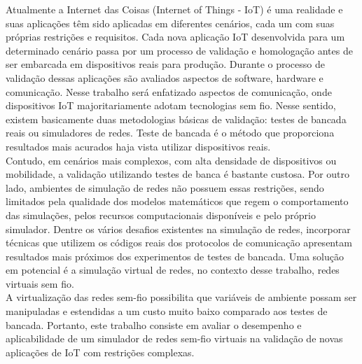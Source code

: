 %
%


Atualmente a Internet das Coisas (Internet of Things - IoT) é uma realidade e suas aplicações têm sido aplicadas em diferentes cenários, cada um com suas próprias restrições e requisitos. Cada nova aplicação IoT desenvolvida para um determinado cenário passa por um processo de validação e homologação antes de ser embarcada em dispositivos reais para produção. Durante o processo de validação dessas aplicações são avaliados aspectos de software, hardware e comunicação. Nesse trabalho será enfatizado aspectos de comunicação, onde dispositivos IoT majoritariamente adotam tecnologias sem fio. Nesse sentido, existem basicamente duas metodologias básicas de validação: testes de bancada reais ou simuladores de redes. Teste de bancada é o método que proporciona resultados mais acurados haja vista utilizar dispositivos reais. \\
Contudo, em cenários mais complexos, com alta densidade de dispositivos ou mobilidade, a validação utilizando testes de banca é bastante custosa. Por outro lado, ambientes de simulação de redes não possuem essas restrições, sendo limitados pela qualidade dos modelos matemáticos que regem o comportamento das simulações, pelos recursos computacionais disponíveis e pelo próprio simulador. Dentre os vários desafios existentes na simulação de redes, incorporar técnicas que utilizem os códigos reais dos protocolos de comunicação apresentam resultados mais próximos dos experimentos de testes de bancada. Uma solução em potencial é a simulação virtual de redes, no contexto desse trabalho, redes virtuais sem fio. \\
A virtualização das redes sem-fio possibilita que variáveis de ambiente possam ser manipuladas e estendidas a um custo muito baixo comparado aos testes de bancada. Portanto, este trabalho consiste em avaliar o desempenho e aplicabilidade de um simulador de redes sem-fio virtuais na validação de novas aplicações de IoT com restrições complexas.



